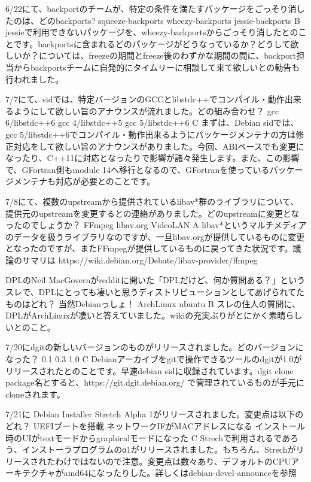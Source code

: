 %

\santaku
{6/22にて、backportのチームが、特定の条件を満たすパッケージをごっそり消したのは、どのbackports?}
{squeeze-backports}
{wheezy-backports}
{jessie-backports}
{B}
{jessieで利用できないパッケージを、wheezy-backportsからごっそり消したとのことです。backportsに含まれるどのパッケージがどうなっているか？どうして欲しいか？については、freezeの期間とfreeze後のわずかな期間の間に、backport担当からbackportsチームに自発的にタイムリーに相談して来て欲しいとの勧告も行われました。}

\santaku
{7/7にて、sidでは、特定バージョンのGCCとlibstdc++でコンパイル・動作出来るようにして欲しい旨のアナウンスが流れました。どの組み合わせ？}
{gcc 6/libstdc++6}
{gcc 4/libstdc++5}
{gcc 5/libstdc++6}
{C}
{まずは、Debian sidでは、gcc 5/libstdc++6でコンパイル・動作出来るようにパッケージメンテナの方は修正対応をして欲しい旨のアナウンスがありました。今回、ABIベースでも変更になったり、C++11に対応となったりで影響が諸々発生します。また、この影響で、GFortran側もmodule 14へ移行となるので、GFortranを使っているパッケージメンテナも対応が必要とのことです。}

\santaku
{7/8にて、複数のupstreamから提供されているlibav*群のライブラリについて、提供元のupstreamを変更するとの連絡がありました。どのupstreamに変更となったのでしょうか？}
{FFmpeg}
{libav.org}
{VideoLAN}
{A}
{libav*というマルチメディアのデータを扱うライブラリなのですが、一旦libav.orgが提供しているものに変更となったのですが、またFFmpegが提供しているものに戻ってきた状況です。議論のサマリは https://wiki.debian.org/Debate/libav-provider/ffmpeg}

\santaku
{DPLのNeil MacGovernがredditに開いた「DPLだけど、何か質問ある？」というスレで、DPLにとっても凄いと思うディストリビューションとしてあげられてたものはどれ？}
{当然Debianっしょ！}
{ArchLinux}
{ubuntu}
{B}
{スレの住人の質問に、DPLがArchLinuxが凄いと答えていました。wikiの充実ぶりがとにかく素晴らしいとのこと。}

\santaku
{7/20にdgitの新しいバージョンのものがリリースされました。どのバージョンになった？}
{0.1}
{0.3}
{1.0}
{C}
{Debianアーカイブをgitで操作できるツールのdgitが1.0がリリースされたとのことです。早速debian sidに収録されています。dgit clone package名とすると、https://git.dgit.debian.org/ で管理されているものが手元にcloneされます。}

\santaku
{7/21に Debian Installer Stretch Alpha 1がリリースされました。変更点は以下のどれ？}
{UEFIブートを搭載}
{ネットワークIFがMACアドレスになる}
{インストール時のUIがtextモードからgraphicalモードになった}
{C}
{Strechで利用されるであろう、インストーラプログラムのα1がリリースされました。もちろん、Strechがリリースされたわけではないので注意。変更点は数々あり、デフォルトのCPUアーキテクチャがamd64になったりした。詳しくはdebian-devel-announceを参照}
